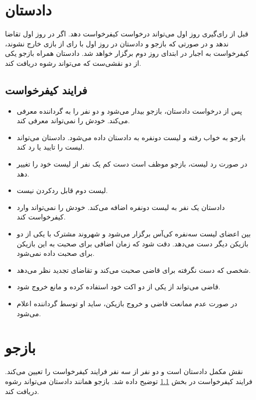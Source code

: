 \documentclass[12pt]{extarticle}
\begin{document}
\clearpage
\section{دادستان}\label{prosecutor}
قبل از رای‌گیری روز اول می‌تواند درخواست کیفرخواست دهد. اگر در روز اول تقاضا ندهد و در صورتی که بازجو و دادستان در روز اول با رای از بازی خارج نشوند، کیفرخواست به اجبار در ابتدای روز دوم برگزار خواهد شد. دادستان همراه بازجو یکی از دو نقشی‌ست که می‌تواند رشوه دریافت کند.

\subsection{فرایند کیفرخواست}\label{indictment}
\begin{itemize}
	\item
	      پس از درخواست دادستان، بازجو بیدار می‌شود و دو نفر را به گرداننده معرفی می‌کند. خودش را نمی‌تواند معرفی کند.
	\item
	      بازجو به خواب رفته و لیست دونفره به دادستان داده می‌شود. دادستان می‌تواند لیست را تایید یا رد کند.
	\item
	      در صورت رد لیست، بازجو موظف است دست کم یک نفر از لیست خود را تغییر دهد.
	\item
	      لیست دوم قابل ردکردن نیست.
	\item
	      دادستان یک نفر به لیست دونفره اضافه می‌کند. خودش را نمی‌تواند وارد کیفرخواست کند.
	\item
	      بین اعضای لیست سه‌نفره کی‌آس برگزار می‌شود و شهروند مشترک با یکی از دو بازیکن دیگر دست می‌دهد. دقت شود که زمان اضافی برای صحبت به این بازیکن برای صحبت داده نمی‌شود.
	\item
	      شخصی که دست نگرفته برای قاضی صحبت می‌کند و تقاضای تجدید نظر می‌دهد.
	\item
	      قاضی می‌تواند از یکی از دو اکت خود استفاده کرده و مانع خروج شود.
	\item
	      در صورت عدم ممانعت قاضی و خروج بازیکن، ساید او توسط گرداننده اعلام می‌شود.
\end{itemize}

\section{بازجو}
نقش مکمل دادستان است و دو نفر از سه نفر فرایند کیفرخواست را تعیین می‌کند. فرایند کیفرخواست در بخش
\ref{indictment}
توضیح داده شد.
بازجو همانند دادستان می‌تواند رشوه دریافت کند.
\end{document}

